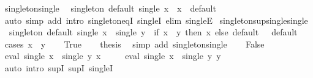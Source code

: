 \begin{isabellebody}
\endisatagproof
{\isafoldproof}%
%
\isadelimproof
\isanewline
%
\endisadelimproof
\isanewline
{}\isamarkupfalse%
\ singleton{\isacharunderscore}{\kern0pt}single{\isacharcolon}{\kern0pt}\isanewline
\ \ {\isachardoublequoteopen}singleton\ default\ {\isacharparenleft}{\kern0pt}single\ x{\isacharparenright}{\kern0pt}\ {\isacharequal}{\kern0pt}\ x{\isachardoublequoteclose}\ \ default\isanewline
%
\isadelimproof
\ \ %
\endisadelimproof
%
\isatagproof
{}\isamarkupfalse%
\ {\isacharparenleft}{\kern0pt}auto\ simp\ add{\isacharcolon}{\kern0pt}\ intro{\isacharcolon}{\kern0pt}\ singleton{\isacharunderscore}{\kern0pt}eqI\ singleI\ elim{\isacharcolon}{\kern0pt}\ singleE{\isacharparenright}{\kern0pt}%
\endisatagproof
{\isafoldproof}%
%
\isadelimproof
\isanewline
%
\endisadelimproof
\isanewline
{}\isamarkupfalse%
\ singleton{\isacharunderscore}{\kern0pt}sup{\isacharunderscore}{\kern0pt}single{\isacharunderscore}{\kern0pt}single{\isacharcolon}{\kern0pt}\isanewline
\ \ {\isachardoublequoteopen}singleton\ default\ {\isacharparenleft}{\kern0pt}single\ x\ {\isasymsqunion}\ single\ y{\isacharparenright}{\kern0pt}\ {\isacharequal}{\kern0pt}\ {\isacharparenleft}{\kern0pt}if\ x\ {\isacharequal}{\kern0pt}\ y\ then\ x\ else\ default\ {\isacharparenleft}{\kern0pt}{\isacharparenright}{\kern0pt}{\isacharparenright}{\kern0pt}{\isachardoublequoteclose}\ \ default\isanewline
%
\isadelimproof
%
\endisadelimproof
%
\isatagproof
{}\isamarkupfalse%
\ {\isacharparenleft}{\kern0pt}cases\ {\isachardoublequoteopen}x\ {\isacharequal}{\kern0pt}\ y{\isachardoublequoteclose}{\isacharparenright}{\kern0pt}\isanewline
\ \ \isamarkupfalse%
\ True\ \isamarkupfalse%
\ \isamarkupfalse%
\ {\isacharquery}{\kern0pt}thesis\ \isamarkupfalse%
\ {\isacharparenleft}{\kern0pt}simp\ add{\isacharcolon}{\kern0pt}\ singleton{\isacharunderscore}{\kern0pt}single{\isacharparenright}{\kern0pt}\isanewline
{}\isamarkupfalse%
\isanewline
\ \ \isamarkupfalse%
\ False\isanewline
\ \ \isamarkupfalse%
\ {\isachardoublequoteopen}eval\ {\isacharparenleft}{\kern0pt}single\ x\ {\isasymsqunion}\ single\ y{\isacharparenright}{\kern0pt}\ x{\isachardoublequoteclose}\isanewline
\ \ \ \ \ {\isachardoublequoteopen}eval\ {\isacharparenleft}{\kern0pt}single\ x\ {\isasymsqunion}\ single\ y{\isacharparenright}{\kern0pt}\ y{\isachardoublequoteclose}\isanewline
\ \ \isamarkupfalse%
\ {\isacharparenleft}{\kern0pt}auto\ intro{\isacharcolon}{\kern0pt}\ supI{}\ supI{}\ singleI{\isacharparenright}{\kern0pt}\isanewline

\end{isabellebody}
